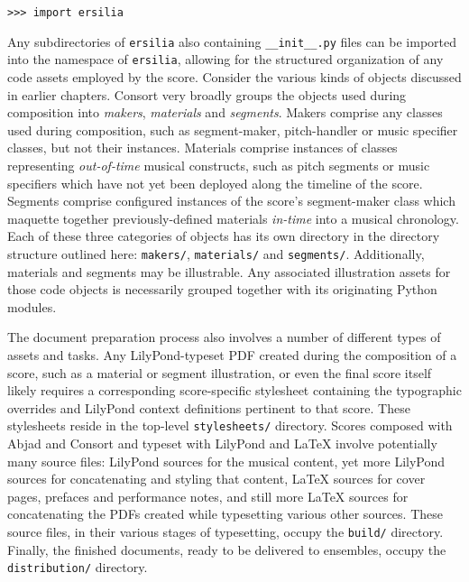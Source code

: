 \begin{comment}
<abjad>
import ersilia
</abjad>
\end{comment}

\begin{abjadbookoutput}
\begin{singlespacing}
\vspace{-0.5\baselineskip}
\begin{verbatim}
>>> import ersilia
\end{verbatim}
\end{singlespacing}
\end{abjadbookoutput}

\noindent Any subdirectories of \texttt{ersilia} also containing
\texttt{\_\_init\_\_.py} files can be imported into the namespace of
\texttt{ersilia}, allowing for the structured organization of any code assets
employed by the score. Consider the various kinds of objects discussed in
earlier chapters. Consort very broadly groups the objects used during
composition into \emph{makers}, \emph{materials} and \emph{segments}. Makers
comprise any classes used during composition, such as segment-maker,
pitch-handler or music specifier classes, but not their instances. Materials
comprise instances of classes representing \emph{out-of-time} musical
constructs, such as pitch segments or music specifiers which have not yet been
deployed along the timeline of the score. Segments comprise configured
instances of the score's segment-maker class which maquette together
previously-defined materials \emph{in-time} into a musical chronology. Each of
these three categories of objects has its own directory in the directory
structure outlined here: \texttt{makers/}, \texttt{materials/} and
\texttt{segments/}. Additionally, materials and segments may be illustrable.
Any associated illustration assets for those code objects is necessarily
grouped together with its originating Python modules.

The document preparation process also involves a number of different types
of assets and tasks. Any LilyPond-typeset PDF created during the composition of
a score, such as a material or segment illustration, or even the final score
itself likely requires a corresponding score-specific stylesheet containing
the typographic overrides and LilyPond context definitions pertinent to that
score. These stylesheets reside in the top-level \texttt{stylesheets/}
directory. Scores composed with Abjad and Consort and typeset with LilyPond and
LaTeX involve potentially many source files: LilyPond sources for the musical
content, yet more LilyPond sources for concatenating and styling that content,
LaTeX sources for cover pages, prefaces and performance notes, and still more
LaTeX sources for concatenating the PDFs created while typesetting various
other sources. These source files, in their various stages of typesetting,
occupy the \texttt{build/} directory. Finally, the finished documents, ready to
be delivered to ensembles, occupy the \texttt{distribution/} directory.

